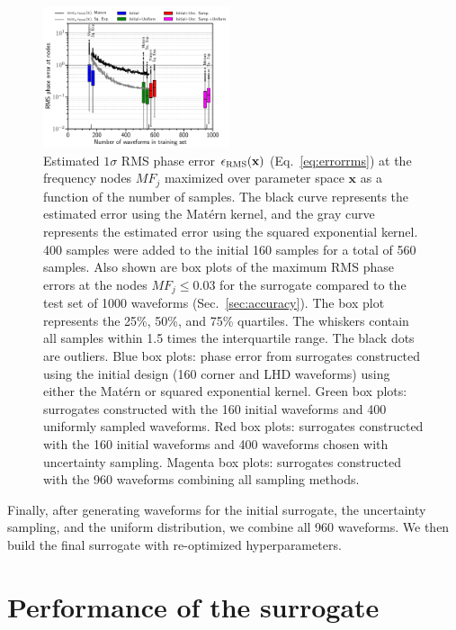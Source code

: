 \documentclass[prd,aps,letter,twocolumn,floatfix,notitlepage,nofootinbib]{revtex4-1}
\def\bx{\mathbf{x}}
\begin{document}
\begin{figure}[htb]
\centering
\includegraphics[width=0.49\textwidth]{uncertaintysampling.pdf}
\caption{Estimated $1\sigma$ RMS phase error $\epsilon_{\rm RMS}(\bx)$ (Eq.~\eqref{eq:errorrms}) at the frequency nodes $MF_j$ maximized over parameter space $\bx$ as a function of the number of samples. The black curve represents the estimated error using the Mat\'{e}rn kernel, and the gray curve represents the estimated error using the squared exponential kernel. 400 samples were added to the initial 160 samples for a total of 560 samples. Also shown are box plots of the maximum RMS phase errors at the nodes $MF_j \le 0.03$ for the surrogate compared to the test set of 1000 waveforms (Sec.~\ref{sec:accuracy}). The box plot represents the 25\%, 50\%, and 75\% quartiles. The whiskers contain all samples within 1.5 times the interquartile range. The black dots are outliers. Blue box plots: phase error from surrogates constructed using the initial design (160 corner and LHD waveforms) using either the Mat\'{e}rn or squared exponential kernel. Green box plots: surrogates constructed with the 160 initial waveforms and 400 uniformly sampled waveforms. Red box plots: surrogates constructed with the 160 initial waveforms and 400 waveforms chosen with uncertainty sampling. Magenta box plots: surrogates constructed with the 960 waveforms combining all sampling methods.}
\label{fig:uncsamp}
\end{figure}

Finally, after generating waveforms for the initial surrogate, the uncertainty sampling, and the uniform distribution, we combine all 960 waveforms. We then build the final surrogate with re-optimized hyperparameters.



\section{Performance of the surrogate}
\label{sec:performance}
\end{document}
